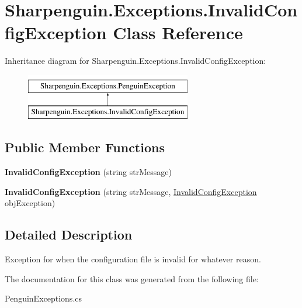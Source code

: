 \hypertarget{classSharpenguin_1_1Exceptions_1_1InvalidConfigException}{\section{\-Sharpenguin.\-Exceptions.\-Invalid\-Config\-Exception \-Class \-Reference}
\label{classSharpenguin_1_1Exceptions_1_1InvalidConfigException}
}
\-Inheritance diagram for \-Sharpenguin.\-Exceptions.\-Invalid\-Config\-Exception\-:\begin{figure}[H]
\begin{center}
\leavevmode
\includegraphics[height=2.000000cm]{classSharpenguin_1_1Exceptions_1_1InvalidConfigException}
\end{center}
\end{figure}
\subsection*{\-Public \-Member \-Functions}
\begin{DoxyCompactItemize}
\item 
\hypertarget{classSharpenguin_1_1Exceptions_1_1InvalidConfigException_a0c85ec92c0d3aac12be69f8cefdfed1d}{{\bfseries \-Invalid\-Config\-Exception} (string str\-Message)}\label{classSharpenguin_1_1Exceptions_1_1InvalidConfigException_a0c85ec92c0d3aac12be69f8cefdfed1d}

\item 
\hypertarget{classSharpenguin_1_1Exceptions_1_1InvalidConfigException_a74d53bab31ab1634694271b07745c83c}{{\bfseries \-Invalid\-Config\-Exception} (string str\-Message, \hyperlink{classSharpenguin_1_1Exceptions_1_1InvalidConfigException}{\-Invalid\-Config\-Exception} obj\-Exception)}\label{classSharpenguin_1_1Exceptions_1_1InvalidConfigException_a74d53bab31ab1634694271b07745c83c}

\end{DoxyCompactItemize}


\subsection{\-Detailed \-Description}
\-Exception for when the configuration file is invalid for whatever reason. 

\-The documentation for this class was generated from the following file\-:\begin{DoxyCompactItemize}
\item 
\-Penguin\-Exceptions.\-cs\end{DoxyCompactItemize}
